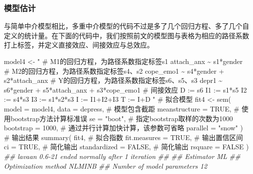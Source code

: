 \documentclass[
  chinese-hans,
  letterpaper,
  DIV=11,
  numbers=noendperiod]{scrartcl}
\newenvironment{Shaded}{\begin{snugshade}}{\end{snugshade}}
\newcommand{\AttributeTok}[1]{\textcolor[rgb]{0.40,0.45,0.13}{#1}}
\newcommand{\CommentTok}[1]{\textcolor[rgb]{0.37,0.37,0.37}{#1}}
\newcommand{\ConstantTok}[1]{\textcolor[rgb]{0.56,0.35,0.01}{#1}}
\newcommand{\DecValTok}[1]{\textcolor[rgb]{0.68,0.00,0.00}{#1}}
\newcommand{\DocumentationTok}[1]{\textcolor[rgb]{0.37,0.37,0.37}{\textit{#1}}}
\newcommand{\FunctionTok}[1]{\textcolor[rgb]{0.28,0.35,0.67}{#1}}
\newcommand{\NormalTok}[1]{\textcolor[rgb]{0.00,0.23,0.31}{#1}}
\newcommand{\OtherTok}[1]{\textcolor[rgb]{0.00,0.23,0.31}{#1}}
\newcommand{\StringTok}[1]{\textcolor[rgb]{0.13,0.47,0.30}{#1}}
\begin{document}
\subsubsection{模型估计}\label{ux6a21ux578bux4f30ux8ba1-2}

与简单中介模型相比，多重中介模型的代码不过是多了几个回归方程、多了几个自定义的统计量。在下面的代码中，我们按照前文的模型图与表格为相应的路径系数打上标签，并定义直接效应、间接效应与总效应。

\begin{Shaded}
\begin{Highlighting}[numbers=left,,]
\NormalTok{model4 }\OtherTok{\textless{}{-}} \StringTok{"}
\StringTok{  \# M1的回归方程，为路径系数指定标签s1}
\StringTok{  attach\_anx \textasciitilde{} s1*gender}
\StringTok{  \# M2的回归方程，为路径系数指定标签s4、s2}
\StringTok{  cope\_emo1 \textasciitilde{} s4*gender + s2*attach\_anx}
\StringTok{  \# Y的回归方程，为路径系数指定标签s6、s5、s3}
\StringTok{  depr1 \textasciitilde{} s6*gender + s5*attach\_anx + s3*cope\_emo1}
\StringTok{  \# 间接效应}
\StringTok{  D := s6}
\StringTok{  I1 := s1*s5}
\StringTok{  I2 := s4*s3}
\StringTok{  I3 := s1*s2*s3}
\StringTok{  I := I1+I2+I3}
\StringTok{  T := I+D}
\StringTok{"}
\CommentTok{\# 拟合模型}
\NormalTok{fit4 }\OtherTok{\textless{}{-}} \FunctionTok{sem}\NormalTok{(}
  \AttributeTok{model =}\NormalTok{ model4,}
  \AttributeTok{data =}\NormalTok{ depress,}
  \CommentTok{\# 模型包含截距}
  \AttributeTok{meanstructure =} \ConstantTok{TRUE}\NormalTok{,}
  \CommentTok{\# 使用bootstrap方法计算标准误}
  \AttributeTok{se =} \StringTok{"boot"}\NormalTok{,}
  \CommentTok{\# 指定bootstrap取样的次数为1000}
  \AttributeTok{bootstrap =} \DecValTok{1000}\NormalTok{,}
  \CommentTok{\# 通过并行计算加快计算，该参数可省略}
  \AttributeTok{parallel =} \StringTok{"snow"}
\NormalTok{)}
\CommentTok{\# 输出结果}
\FunctionTok{summary}\NormalTok{(}
\NormalTok{  fit4,}
  \CommentTok{\# 拟合指数}
  \AttributeTok{fit.measures =} \ConstantTok{TRUE}\NormalTok{,}
  \CommentTok{\# 输出置信区间}
  \AttributeTok{ci =} \ConstantTok{TRUE}\NormalTok{,}
  \CommentTok{\# 简化输出}
  \AttributeTok{standardized =} \ConstantTok{FALSE}\NormalTok{,}
  \CommentTok{\# 简化输出}
  \AttributeTok{rsquare =} \ConstantTok{FALSE}
\NormalTok{)}
\DocumentationTok{\#\# lavaan 0.6{-}21 ended normally after 1 iteration}
\DocumentationTok{\#\# }
\DocumentationTok{\#\#   Estimator                                         ML}
\DocumentationTok{\#\#   Optimization method                           NLMINB}
\DocumentationTok{\#\#   Number of model parameters                        12}

\end{Highlighting}
\end{Shaded}
\end{document}
